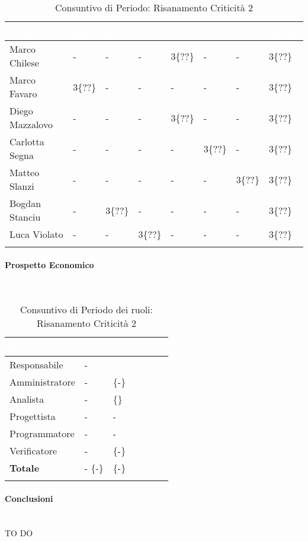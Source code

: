 \begin{longtable}{|C{.30\textwidth}|C{.06\textwidth}|C{.06\textwidth}|C{.06\textwidth} | C{.06\textwidth}| C{.06\textwidth} | C{.06\textwidth} | C{.10\textwidth} |}
\hline
{}	\textbf{\textcolor{white}{Nome}} & \textbf{\textcolor{white}{RE}} & \textbf{\textcolor{white}{AM}} & \textbf{\textcolor{white}{AN}} & \textbf{\textcolor{white}{PJ}} & \textbf{\textcolor{white}{PR}} & \textbf{\textcolor{white}{VE}} & \textbf{\textcolor{white}{Totale}}\\
\hline \hline

Marco Chilese & - & - & - & 3\{??\} & - & - & 3\{??\}\\
\hline
{}Marco Favaro & 3\{??\} & - & - & - & - & - & 3\{??\} \\
\hline
Diego Mazzalovo & - & - & - & 3\{??\} & - & - & 3\{??\} \\
\hline
{}Carlotta Segna & - & - & - & - & 3\{??\} & - & 3\{??\}\\
\hline
Matteo Slanzi & - & - & - & - & - & 3\{??\} & 3\{??\}\\
\hline
{}Bogdan Stanciu & - & 3\{??\} & - & - & - & - & 3\{??\} \\
\hline
Luca Violato & - & - & 3\{??\} & - & - & - & 3\{??\} \\
\hline

\caption{Consuntivo di Periodo: Risanamento Criticità 2}
\label{Distribuzione oraria del periodo di rc2}
\end{longtable}

\paragraph{Prospetto Economico} \-\\

\begin{longtable}{| C{.30\textwidth}| C{.15\textwidth}| C{.20\textwidth}|}
\hline
{}\textbf{\textcolor{white}{Ruolo}} & \textbf{\textcolor{white}{Ore}} & \textbf{\textcolor{white}{Costo in \euro}} \\
\hline 
Responsabile & - & \EUR{\{\EUR{-}\}}\\
\hline
{}Amministratore & - & \EUR{-} \{-\EUR{-}\} \\
\hline
Analista & - & \EUR{-} \{\EUR{-}\} \\
\hline
{}Progettista & - & - \\
\hline
Programmatore & - & - \\
\hline
{}Verificatore & - & \EUR{-} \{-\EUR{-}\}\\
\hline
\textbf{Totale} & - \{-\} & \EUR{-} \{-\EUR{-}\}\\
\hline
\caption{Consuntivo di Periodo dei ruoli: Risanamento Criticità 2}
\label{Distribuzione oraria Ruoli del Periodo di rc2}
\end{longtable}

\paragraph{Conclusioni} ~\\
 
 TO DO\\

\pagebreak



